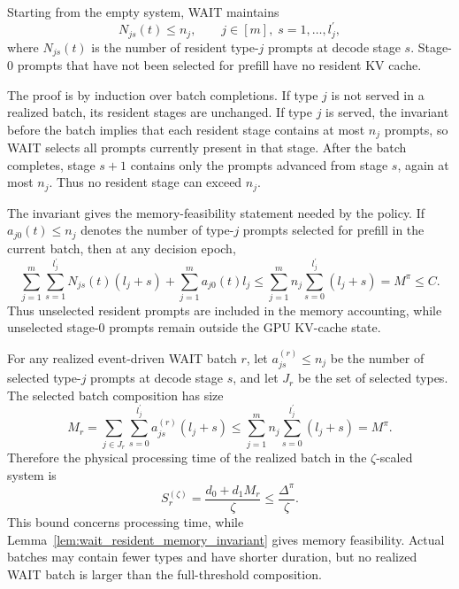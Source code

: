 \begin{lemma}\label{lem:wait_resident_memory_invariant}
Starting from the empty system, WAIT maintains
\[
    N_{js}(t)\le n_j,\qquad j\in[m],\; s=1,\ldots,l_j^\prime,
\]
where \(N_{js}(t)\) is the number of resident type-\(j\) prompts at decode stage \(s\). Stage-0 prompts that have not been selected for prefill have no resident KV cache.
\end{lemma}
\noindent The proof is by induction over batch completions. If type \(j\) is not served in a realized batch, its resident stages are unchanged. If type \(j\) is served, the invariant before the batch implies that each resident stage contains at most \(n_j\) prompts, so WAIT selects all prompts currently present in that stage. After the batch completes, stage \(s+1\) contains only the prompts advanced from stage \(s\), again at most \(n_j\). Thus no resident stage can exceed \(n_j\).

The invariant gives the memory-feasibility statement needed by the policy. If \(a_{j0}(t)\le n_j\) denotes the number of type-\(j\) prompts selected for prefill in the current batch, then at any decision epoch,
\[
    \sum_{j=1}^m\sum_{s=1}^{l_j^\prime}N_{js}(t)(l_j+s)
    +
    \sum_{j=1}^m a_{j0}(t)l_j
    \le
    \sum_{j=1}^m n_j\sum_{s=0}^{l_j^\prime}(l_j+s)
    =
    M^\pi
    \le C .
\]
Thus unselected resident prompts are included in the memory accounting, while unselected stage-0 prompts remain outside the GPU KV-cache state.

For any realized event-driven WAIT batch \(r\), let \(a^{(r)}_{js}\le n_j\) be the number of selected type-\(j\) prompts at decode stage \(s\), and let \(J_r\) be the set of selected types. The selected batch composition has size
\[
    M_r
    =
    \sum_{j\in J_r}\sum_{s=0}^{l_j^\prime} a^{(r)}_{js}(l_j+s)
    \le
    \sum_{j=1}^m n_j\sum_{s=0}^{l_j^\prime}(l_j+s)
    =
    M^\pi.
\]
Therefore the physical processing time of the realized batch in the \(\zeta\)-scaled system is
\[
    S_r^{(\zeta)}
    =
    \frac{d_0+d_1M_r}{\zeta}
    \le
    \frac{\Delta^\pi}{\zeta}.
\]
This bound concerns processing time, while Lemma~\ref{lem:wait_resident_memory_invariant} gives memory feasibility. Actual batches may contain fewer types and have shorter duration, but no realized WAIT batch is larger than the full-threshold composition.


